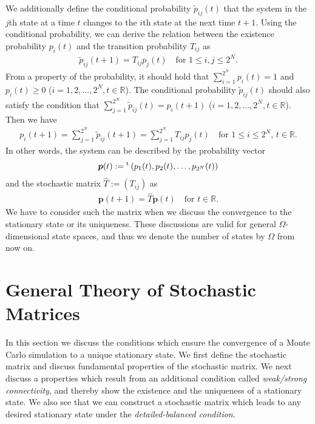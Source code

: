 We additionally define the conditional probability $\tilde{p}_{ij}(t)$ that the system in the $j$th state at a time $t$ changes to the $i$th state at the next time $t+1$. Using the conditional probability, we can derive the relation between the existence probability $p_{i}(t)$ and the transition probability $T_{ij}$ as
\begin{align}
\tilde{p}_{ij}(t + 1) = T_{ij} p_{j}(t)\quad\text{for $1\leq i,j\leq 2^{N}$}.
\end{align}
From a property of the probability, it should hold that $\sum_{i=1}^{2^{N}}p_{i}(t)=1$ and $p_{i}(t) \ge 0$ ($i=1,2,\dots,2^{N}, t\in\mathbb{R}$). The conditional probability $\tilde{p}_{ij}(t)$ should also satisfy the condition that $\sum_{j=1}^{2^{N}}\tilde{p}_{ij}(t) = p_{i}(t+1)$ ($i=1,2,\dots,2^{N}, t\in\mathbb{R}$). Then we have
\begin{align}
p_{i}(t+1) = \sum_{j=1}^{2^{N}}\tilde{p}_{ij}(t + 1) = \sum_{j=1}^{2^{N}}T_{ij}p_{j}(t)\quad\text{for $1\leq i\leq 2^{N}$, $t\in\mathbb{R}$}.
\end{align}
In other words, the system can be described by the probability vector
\begin{align}
\bm{p}(t):={}^{\rm t}\left(p_{1}(t),p_{2}(t),\dots,p_{2^{N}}(t)\right)
\end{align}
and the stochastic matrix $\hat{T}:=\left(T_{ij}\right)$ as
\begin{align}
\bm{p}(t + 1) = \hat{T}\bm{p}(t)\quad\text{for $t\in\mathbb{R}$}.
\end{align}
We have to consider such the matrix when we discuss the convergence to the stationary state or its uniqueness. These discussions are valid for general $\Omega$-dimensional state spaces, and thus we denote the number of states by $\Omega$ from now on.

\section{General Theory of Stochastic Matrices}
In this section we discuss the conditions which ensure the convergence of a Monte Carlo simulation to a unique stationary state. We first define the stochastic matrix and discuss fundamental properties of the stochastic matrix. We next discuss a properties which result from an additional condition called \textit{weak/strong connectivity}, and thereby show the existence and the uniqueness of a stationary state. We also see that we can construct a stochastic matrix which leads to any desired stationary state under the \textit{detailed-balanced condition}.

